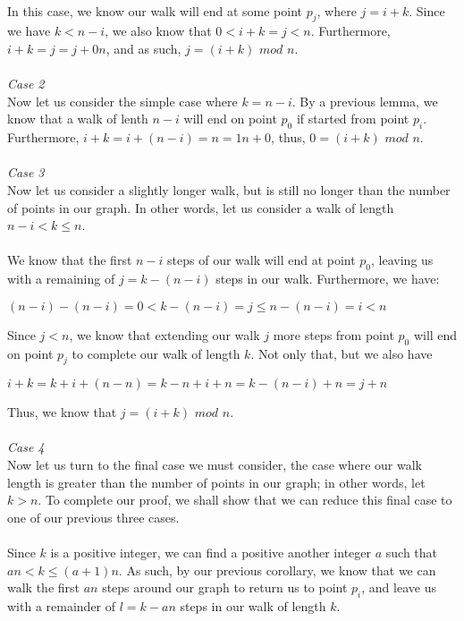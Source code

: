\documentclass[a4paper,12pt]{article}
\begin{document}
\\
In this case, we know our walk will end at some point $p_j$, where $j = i + k$. Since we have $k < n - i$, we also know that $0 < i + k = j < n$. Furthermore, $i + k = j = j + 0n$, and as such, $j = (i + k)$ $mod$ $n$.\\
\\
\textit{Case 2}\\
Now let us consider the simple case where $k = n - i$. By a previous lemma, we know that a walk of lenth $n - i$ will end on point $p_0$ if started from point $p_i$. Furthermore, $i + k = i + (n - i) = n = 1n + 0$, thus, $0 = (i + k)$ $mod$ $n$.\\
\\
\textit{Case 3}\\
Now let us consider a slightly longer walk, but is still no longer than the number of points in our graph. In other words, let us consider a walk of length $n - i < k \leq n$.\\
\\
We know that the first $n - i$ steps of our walk will end at point $p_0$, leaving us with a remaining of $j = k - (n - i)$ steps in our walk. Furthermore, we have:
\begin{center}
$(n - i) - (n - i) = 0 < k - (n - i) = j \leq n - (n - i) = i < n$ 
\end{center}
Since $j < n$, we know that extending our walk $j$ more steps from point $p_0$ will end on point $p_j$ to complete our walk of length $k$. Not only that, but we also have
\begin{center}
$i + k = k + i + (n - n) = k - n + i + n = k - (n - i) + n = j + n$
\end{center} 
Thus, we know that $j = (i + k)$ $mod$ $n$.\\
\\
\textit{Case 4}\\
Now let us turn to the final case we must consider, the case where our walk length is greater than the number of points in our graph; in other words, let $k > n$. To complete our proof, we shall show that we can reduce this final case to one of our previous three cases.\\
\\
Since $k$ is a positive integer, we can find a positive another integer $a$ such that $an < k \leq (a + 1)n$. As such, by our previous corollary, we know that we can walk the first $an$ steps around our graph to return us to point $p_i$, and leave us with a remainder of $l = k - an$ steps in our walk of length $k$.\\
\end{document}

